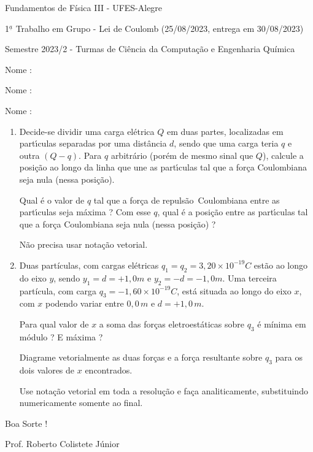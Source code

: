 \documentclass[10pt]{article}
\begin{document}
\begin{center}
Fundamentos de F\'{i}sica III - UFES-Alegre

1$^{\underline{a}}$ Trabalho em Grupo - Lei de Coulomb (25/08/2023, entrega em 30/08/2023)

Semestre 2023/2 - Turmas de Ci\^{e}ncia da Computa\c{c}\~{a}o e Engenharia Química
\end{center}

Nome : \dotfill 

Nome : \dotfill 

Nome : \dotfill 

\begin{enumerate}
	

\item Decide-se dividir uma carga el\'{e}trica $Q$ em duas partes, localizadas em part\'{\i}culas separadas por uma dist\^{a}ncia $d$, sendo que 
uma carga teria $q$ e outra $(Q-q)$. Para $q$ arbitr\'{a}rio (por\'{e}m de mesmo sinal que $Q$), calcule a posi\c{c}\~{a}o ao longo da
linha que une as part\'{\i}culas tal que a for\c{c}a Coulombiana seja nula (nessa posi\c{c}\~{a}o).

Qual \'{e} o valor de $q$ tal que a for\c{c}a de repuls\~{a}o\ Coulombiana entre as part\'{\i}culas seja m\'{a}xima ? Com esse $q$, qual \'{e} a 
posi\c{c}\~{a}o entre as part\'{\i}culas tal que a for\c{c}a Coulombiana seja nula (nessa posi\c{c}\~{a}o) ?

Não precisa usar nota\c{c}\~{a}o vetorial.


\item Duas part\'{i}culas, com cargas el\'{e}tricas $q_{1} = q_{2} = 3,20\times 10^{-19} C$ est\~{a}o ao longo do eixo $y$, sendo $y_1 = d = +1,0 m$ 
e $y_2 = -d = -1,0 m$. Uma terceira part\'{i}cula, com carga $q_{3} = -1,60\times 10^{-19} C$, est\'{a} situada ao longo do eixo $x$, com $x$ podendo 
variar entre $0,0\,m$ e $d = +1,0\,m$.

Para qual valor de $x$ a soma das for\c{c}as eletroest\'{a}ticas sobre $q_3$ \'{e} m\'{i}nima em m\'{o}dulo ? E m\'{a}xima ? 

Diagrame vetorialmente as duas for\c{c}as e a for\c{c}a resultante sobre $q_3$ para os dois valores de $x$ encontrados.

Use nota\c{c}\~{a}o vetorial em toda a resolu\c{c}\~{a}o e faça analiticamente, substituindo numericamente somente ao final.


\end{enumerate}

\begin{center}
Boa Sorte !

Prof. Roberto Colistete J\'{u}nior

\bigskip
\end{center}
\end{document}
